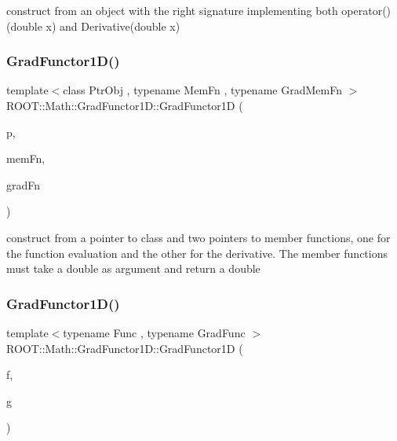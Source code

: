 construct from an object with the right signature implementing both operator() (double x) and Derivative(double x) \mbox{\label{classROOT_1_1Math_1_1GradFunctor1D_a651aeef91a3d1a3ae323969d7239ebb2}} 
\subsubsection{\texorpdfstring{GradFunctor1D()}{GradFunctor1D()}\hspace{0.1cm}{\footnotesize\ttfamily [3/15]}}
{\footnotesize\ttfamily template$<$class Ptr\+Obj , typename Mem\+Fn , typename Grad\+Mem\+Fn $>$ \\
R\+O\+O\+T\+::\+Math\+::\+Grad\+Functor1\+D\+::\+Grad\+Functor1D (\begin{DoxyParamCaption}\item[{const Ptr\+Obj \&}]{p,  }\item[{Mem\+Fn}]{mem\+Fn,  }\item[{Grad\+Mem\+Fn}]{grad\+Fn }\end{DoxyParamCaption})\hspace{0.3cm}{\ttfamily [inline]}}

construct from a pointer to class and two pointers to member functions, one for the function evaluation and the other for the derivative. The member functions must take a double as argument and return a double \mbox{\label{classROOT_1_1Math_1_1GradFunctor1D_a30baab2a961d896e4aab6e60ed30d260}} 
\subsubsection{\texorpdfstring{GradFunctor1D()}{GradFunctor1D()}\hspace{0.1cm}{\footnotesize\ttfamily [4/15]}}
{\footnotesize\ttfamily template$<$typename Func , typename Grad\+Func $>$ \\
R\+O\+O\+T\+::\+Math\+::\+Grad\+Functor1\+D\+::\+Grad\+Functor1D (\begin{DoxyParamCaption}\item[{const Func \&}]{f,  }\item[{const Grad\+Func \&}]{g }\end{DoxyParamCaption})\hspace{0.3cm}{\ttfamily [inline]}}

